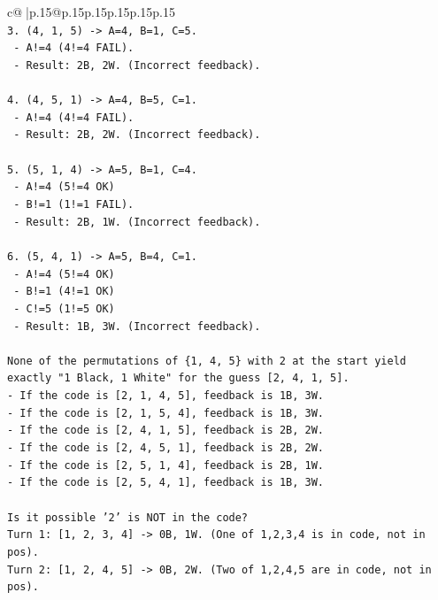 \documentclass{article}
\begin{document}
{\begin{supertabular}{c@{$\;$}|p{.15\linewidth}@{}p{.15\linewidth}p{.15\linewidth}p{.15\linewidth}p{.15\linewidth}p{.15\linewidth}}
{{{\\ 
\texttt{3. (4, 1, 5) {-}> A=4, B=1, C=5.} \\
\texttt{   {-} A!=4 (4!=4 FAIL).} \\
\texttt{   {-} Result: 2B, 2W. (Incorrect feedback).} \\
\\ 
\texttt{4. (4, 5, 1) {-}> A=4, B=5, C=1.} \\
\texttt{   {-} A!=4 (4!=4 FAIL).} \\
\texttt{   {-} Result: 2B, 2W. (Incorrect feedback).} \\
\\ 
\texttt{5. (5, 1, 4) {-}> A=5, B=1, C=4.} \\
\texttt{   {-} A!=4 (5!=4 OK)} \\
\texttt{   {-} B!=1 (1!=1 FAIL).} \\
\texttt{   {-} Result: 2B, 1W. (Incorrect feedback).} \\
\\ 
\texttt{6. (5, 4, 1) {-}> A=5, B=4, C=1.} \\
\texttt{   {-} A!=4 (5!=4 OK)} \\
\texttt{   {-} B!=1 (4!=1 OK)} \\
\texttt{   {-} C!=5 (1!=5 OK)} \\
\texttt{   {-} Result: 1B, 3W. (Incorrect feedback).} \\
\\ 
\texttt{None of the permutations of \{1, 4, 5\} with 2 at the start yield exactly "1 Black, 1 White" for the guess {[}2, 4, 1, 5{]}.} \\
\texttt{{-} If the code is {[}2, 1, 4, 5{]}, feedback is 1B, 3W.} \\
\texttt{{-} If the code is {[}2, 1, 5, 4{]}, feedback is 1B, 3W.} \\
\texttt{{-} If the code is {[}2, 4, 1, 5{]}, feedback is 2B, 2W.} \\
\texttt{{-} If the code is {[}2, 4, 5, 1{]}, feedback is 2B, 2W.} \\
\texttt{{-} If the code is {[}2, 5, 1, 4{]}, feedback is 2B, 1W.} \\
\texttt{{-} If the code is {[}2, 5, 4, 1{]}, feedback is 1B, 3W.} \\
\\ 
\texttt{Is it possible '2' is NOT in the code?} \\
\texttt{Turn 1: {[}1, 2, 3, 4{]} {-}> 0B, 1W. (One of 1,2,3,4 is in code, not in pos).} \\
\texttt{Turn 2: {[}1, 2, 4, 5{]} {-}> 0B, 2W. (Two of 1,2,4,5 are in code, not in pos).} \\
}}}
\end{supertabular}}
\end{document}
